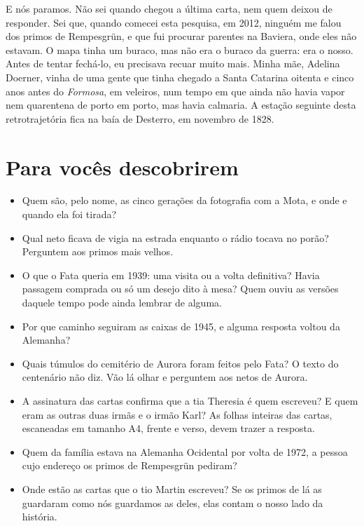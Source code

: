 \documentclass[
  brazilian,
  11pt,
  openany]{book}
\providecommand{\tightlist}{%
  \setlength{\itemsep}{0pt}\setlength{\parskip}{0pt}}
\begin{document}
E nós paramos. Não sei quando chegou a última carta, nem quem deixou de
responder. Sei que, quando comecei esta pesquisa, em 2012, ninguém me
falou dos primos de Rempesgrün, e que fui procurar parentes na Baviera,
onde eles não estavam. O mapa tinha um buraco, mas não era o buraco da
guerra: era o nosso. Antes de tentar fechá-lo, eu precisava recuar muito
mais. Minha mãe, Adelina Doerner, vinha de uma gente que tinha chegado a
Santa Catarina oitenta e cinco anos antes do \emph{Formosa}, em
veleiros, num tempo em que ainda não havia vapor nem quarentena de porto
em porto, mas havia calmaria. A estação seguinte desta retrotrajetória
fica na baía de Desterro, em novembro de 1828.

\section{Para vocês descobrirem}\label{para-vocuxeas-descobrirem-6}

\begin{itemize}
\tightlist
\item
  Quem são, pelo nome, as cinco gerações da fotografia com a Mota, e
  onde e quando ela foi tirada?
\item
  Qual neto ficava de vigia na estrada enquanto o rádio tocava no porão?
  Perguntem aos primos mais velhos.
\item
  O que o Fata queria em 1939: uma visita ou a volta definitiva? Havia
  passagem comprada ou só um desejo dito à mesa? Quem ouviu as versões
  daquele tempo pode ainda lembrar de alguma.
\item
  Por que caminho seguiram as caixas de 1945, e alguma resposta voltou
  da Alemanha?
\item
  Quais túmulos do cemitério de Aurora foram feitos pelo Fata? O texto
  do centenário não diz. Vão lá olhar e perguntem aos netos de Aurora.
\item
  A assinatura das cartas confirma que a tia Theresia é quem escreveu? E
  quem eram as outras duas irmãs e o irmão Karl? As folhas inteiras das
  cartas, escaneadas em tamanho A4, frente e verso, devem trazer a
  resposta.
\item
  Quem da família estava na Alemanha Ocidental por volta de 1972, a
  pessoa cujo endereço os primos de Rempesgrün pediram?
\item
  Onde estão as cartas que o tio Martin escreveu? Se os primos de lá as
  guardaram como nós guardamos as deles, elas contam o nosso lado da
  história.
\end{itemize}
\end{document}
